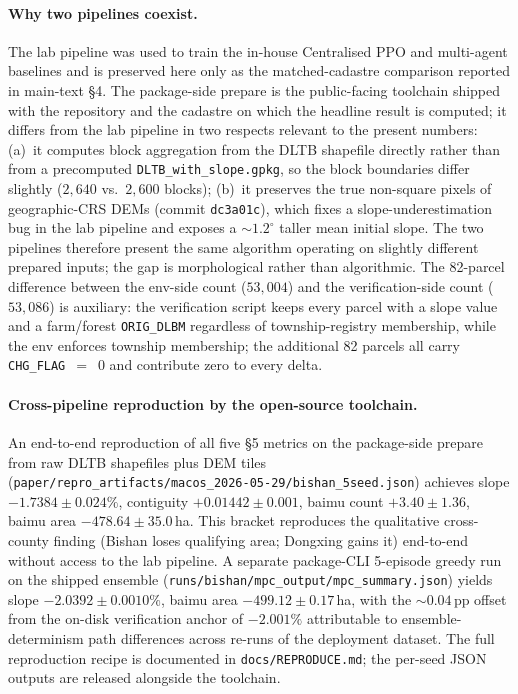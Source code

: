 \documentclass[11pt]{article}
\begin{document}
\paragraph{Why two pipelines coexist.} The lab pipeline was used to train the in-house Centralised PPO and multi-agent baselines and is preserved here only as the matched-cadastre comparison reported in main-text \S4. The package-side prepare is the public-facing toolchain shipped with the repository and the cadastre on which the headline result is computed; it differs from the lab pipeline in two respects relevant to the present numbers: (a)~it computes block aggregation from the DLTB shapefile directly rather than from a precomputed \texttt{DLTB\_with\_slope.gpkg}, so the block boundaries differ slightly ($2{,}640$ vs.\ $2{,}600$ blocks); (b)~it preserves the true non-square pixels of geographic-CRS DEMs (commit \texttt{dc3a01c}), which fixes a slope-underestimation bug in the lab pipeline and exposes a $\sim$$1.2^{\circ}$ taller mean initial slope. The two pipelines therefore present the same algorithm operating on slightly different prepared inputs; the gap is morphological rather than algorithmic. The 82-parcel difference between the env-side count ($53{,}004$) and the verification-side count ($53{,}086$) is auxiliary: the verification script keeps every parcel with a slope value and a farm/forest \texttt{ORIG\_DLBM} regardless of township-registry membership, while the env enforces township membership; the additional 82 parcels all carry \texttt{CHG\_FLAG}~$=$~$0$ and contribute zero to every delta.

\paragraph{Cross-pipeline reproduction by the open-source toolchain.} An end-to-end reproduction of all five \S5 metrics on the package-side prepare from raw DLTB shapefiles plus DEM tiles (\texttt{paper/repro\_artifacts/macos\_2026-05-29/bishan\_5seed.json}) achieves slope $-1.7384 \pm 0.024\%$, contiguity $+0.01442 \pm 0.001$, baimu count $+3.40 \pm 1.36$, baimu area $-478.64 \pm 35.0$\,ha. This bracket reproduces the qualitative cross-county finding (Bishan loses qualifying area; Dongxing gains it) end-to-end without access to the lab pipeline. A separate package-CLI 5-episode greedy run on the shipped ensemble (\texttt{runs/bishan/mpc\_output/mpc\_summary.json}) yields slope $-2.0392 \pm 0.0010\%$, baimu area $-499.12 \pm 0.17$\,ha, with the $\sim$$0.04$\,pp offset from the on-disk verification anchor of $-2.001\%$ attributable to ensemble-determinism path differences across re-runs of the deployment dataset. The full reproduction recipe is documented in \texttt{docs/REPRODUCE.md}; the per-seed JSON outputs are released alongside the toolchain.
\end{document}
